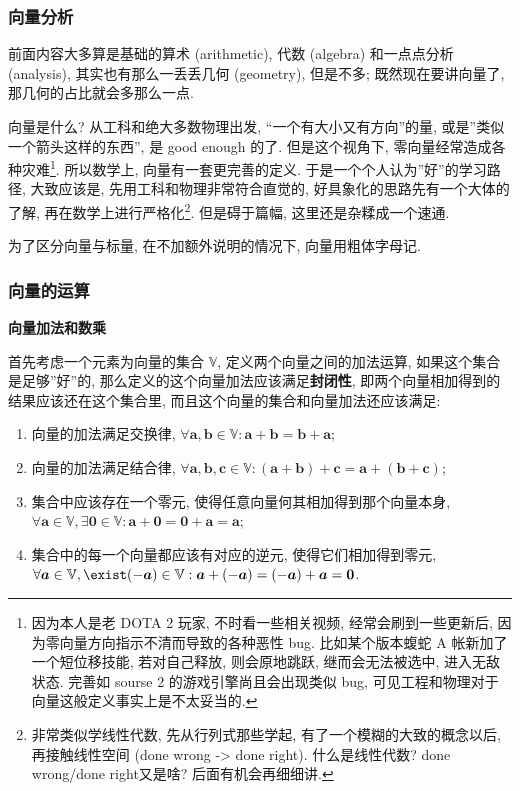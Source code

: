 \hypertarget{ux5411ux91cfux5206ux6790}{%
\subsubsection{向量分析}\label{ux5411ux91cfux5206ux6790}}

前面内容大多算是基础的算术 (arithmetic), 代数 (algebra) 和一点点分析
(analysis), 其实也有那么一丢丢几何 (geometry), 但是不多;
既然现在要讲向量了, 那几何的占比就会多那么一点.

向量是什么? 从工科和绝大多数物理出发, ``一个有大小又有方向''的量,
或是''类似一个箭头这样的东西'', 是 good enough 的了. 但是这个视角下,
零向量经常造成各种灾难\footnote{因为本人是老 DOTA 2 玩家,
  不时看一些相关视频, 经常会刷到一些更新后,
  因为零向量方向指示不清而导致的各种恶性 bug. 比如某个版本蝮蛇 A
  帐新加了一个短位移技能, 若对自己释放, 则会原地跳跃, 继而会无法被选中,
  进入无敌状态. 完善如 sourse 2 的游戏引擎尚且会出现类似 bug,
  可见工程和物理对于向量这般定义事实上是不太妥当的.}. 所以数学上,
向量有一套更完善的定义. 于是一个个人认为''好''的学习路径, 大致应该是,
先用工科和物理非常符合直觉的, 好具象化的思路先有一个大体的了解,
再在数学上进行严格化\footnote{非常类似学线性代数, 先从行列式那些学起,
  有了一个模糊的大致的概念以后, 再接触线性空间 (done wrong
  -\textgreater{} done right). 什么是线性代数? done wrong/done
  right又是啥? 后面有机会再细细讲.}. 但是碍于篇幅,
这里还是杂糅成一个速通.

为了区分向量与标量, 在不加额外说明的情况下, 向量用粗体字母记.

\hypertarget{ux5411ux91cfux7684ux8fd0ux7b97}{%
\subsubsection{向量的运算}\label{ux5411ux91cfux7684ux8fd0ux7b97}}

\textbf{向量加法和数乘}

首先考虑一个元素为向量的集合 \(\mathbb{V}\), 定义两个向量之间的加法运算,
如果这个集合是足够''好''的,
那么定义的这个向量加法应该满足\textbf{封闭性},
即两个向量相加得到的结果应该还在这个集合里,
而且这个向量的集合和向量加法还应该满足:

\begin{enumerate}
\def\labelenumi{\arabic{enumi}.}
\tightlist
\item
  向量的加法满足交换律,
  \(\forall\boldsymbol{a},\boldsymbol{b}\in\mathbb{V}: \boldsymbol{a}+\boldsymbol{b}=\boldsymbol{b}+\boldsymbol{a}\);
\item
  向量的加法满足结合律,
  \(\forall\boldsymbol{a},\boldsymbol{b},\boldsymbol{c}\in\mathbb{V}:(\boldsymbol{a}+\boldsymbol{b})+\boldsymbol{c}=\boldsymbol{a}+(\boldsymbol{b}+\boldsymbol{c})\);
\item
  集合中应该存在一个零元, 使得任意向量何其相加得到那个向量本身,
  \(\forall\boldsymbol{a}\in\mathbb{V},\exists\boldsymbol{0}\in\mathbb{V}:\boldsymbol{a}+\boldsymbol{0}=\boldsymbol{0}+\boldsymbol{a}=\boldsymbol{a}\);
\item
  集合中的每一个向量都应该有对应的逆元, 使得它们相加得到零元,
  \(\forall\boldsymbol{a}\in\mathbb{V},\exist(-\boldsymbol{a})\in\mathbb{V}:\boldsymbol{a}+(-\boldsymbol{a})=(-\boldsymbol{a})+\boldsymbol{a}=\boldsymbol{0}\).
\end{enumerate}

